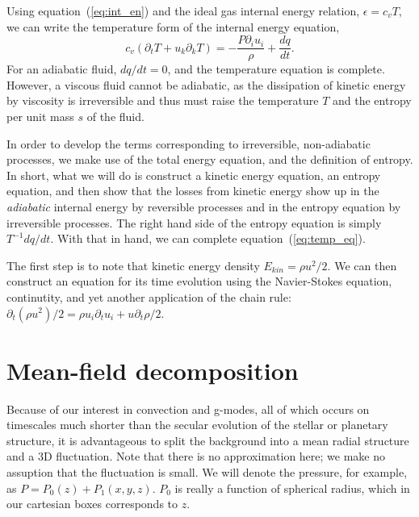 \documentclass[letterpaper,12pt]{paper}
\begin{document}
Using equation~(\ref{eq:int_en}) and the ideal gas internal energy
relation, $\epsilon = c_v T$, we can write the temperature form of the
internal energy equation,
\begin{equation}
  \label{eq:temp_eq}
  c_v (\partial_t T + u_k \partial_k T)  = -\frac{P \partial_i
    u_i}{\rho} + \frac{dq}{dt}.
\end{equation}
For an adiabatic fluid, $dq/dt = 0$, and the temperature equation is
complete. However, a viscous fluid cannot be adiabatic, as the
dissipation of kinetic energy by viscosity is irreversible and thus
must raise the temperature $T$ and the entropy per unit mass $s$ of
the fluid.

In order to develop the terms corresponding to irreversible,
non-adiabatic processes, we make use of the total energy equation, and
the definition of entropy. In short, what we will do is construct a
kinetic energy equation, an entropy equation, and then show that the
losses from kinetic energy show up in the \emph{adiabatic} internal
energy by reversible processes and in the entropy equation by
irreversible processes. The right hand side of the entropy equation is
simply $T^{-1} dq/dt$. With that in hand, we can complete
equation~(\ref{eq:temp_eq}).

The first step is to note that kinetic energy density
$E_{kin} = \rho u^2/2$. We can then construct an equation for its time
evolution using the Navier-Stokes equation, continutity, and yet
another application of the chain rule:
$\partial_t (\rho u^2)/2 = \rho u_i \partial_t u_i + u \partial_t
\rho/2$.

\section{Mean-field decomposition}
\label{sec:meanfield}
Because of our interest in convection and g-modes, all of which occurs
on timescales much shorter than the secular evolution of the stellar
or planetary structure, it is advantageous to split the background
into a mean radial structure and a 3D fluctuation. Note that there is
no approximation here; we make no assuption that the fluctuation is
small. We will denote the pressure, for example, as $P = P_0(z) +
P_1(x,y,z)$. $P_0$ is really a function of spherical radius, which in our
cartesian boxes corresponds to $z$. 
\end{document}
